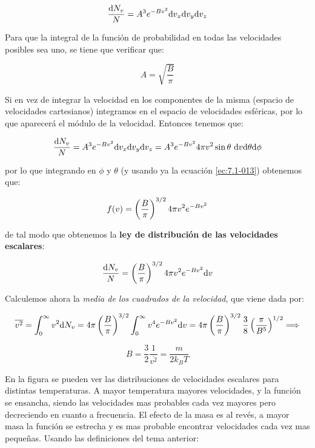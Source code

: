 \documentclass[12pt,a4paper,oneside]{book}
\begin{document}
\begin{equation}
\dfrac{\mathrm{d} N_{v}}{N} = A^3 e^{-Bv^2} \mathrm{d} v_x \mathrm{d} v_y \mathrm{d} v_z
\end{equation}

Para que la integral de la función de probabilidad en todas las velocidades posibles sea uno, se tiene que verificar que:

\begin{equation}
A = \sqrt{\dfrac{B}{\pi}} \label{ec:7.1-013}
\end{equation}

Si en vez de integrar la velocidad en los componentes de la misma (espacio de velocidades cartesianos) integramos en el espacio de velocidades esféricas, por lo que aparecerá el módulo de la velocidad. Entonces tenemos que:

\begin{equation}
\dfrac{\mathrm{d} N_{v}}{N} = A^3 e^{-Bv^2} \mathrm{d} v_x \mathrm{d} v_y \mathrm{d} v_z = A^3 e^{-Bv^2} 4 \pi v^2 \sin \theta \ \mathrm{d} v \mathrm{d} \theta \mathrm{d} \phi 
\end{equation}

por lo que integrando en $\phi$ y $\theta$ (y usando ya la ecuación \ref{ec:7.1-013}) obtenemos que:

\begin{equation}
f(v) = \left( \dfrac{B}{\pi} \right)^{3/2} 4 \pi v^2 e^{-B v^2}
\end{equation}


de tal modo que obtenemos la \textbf{ley de distribución de las velocidades escalares}:

\begin{equation}
\dfrac{\mathrm{d} N_v}{N} = \left( \dfrac{B}{\pi} \right)^{3/2} 4 \pi v^2 e^{-Bv^2} \mathrm{d} v \label{ec:7.1-016}
\end{equation}

Calculemos ahora la \textit{media de los cuadrados de la velocidad}, que viene dada por: 

$$ \overline{v^2} = \int_{0}^{\infty} v^2 \mathrm{d} N_v  = 4 \pi \left( \dfrac{B}{\pi} \right)^{3/2} \int_{0}^{\infty} v^4 e^{-Bv^2} \mathrm{d} v = 4 \pi \left( \dfrac{B}{\pi} \right)^{3/2} \dfrac{3}{8} \left( \dfrac{\pi}{B^5} \right)^{1/2} \Longrightarrow $$

\begin{equation}
B = \dfrac{3}{2} \dfrac{1}{\overline{v^2}} = \dfrac{m}{2 k_B T}
\end{equation}

En la figura se pueden ver las distribuciones de velocidades escalares para distintas temperaturas. A mayor temperatura mayores velocidades, y la función se ensancha, siendo las velocidades mas probables cada vez mayores pero decreciendo en cuanto a frecuencia. El efecto de la masa es al revés, a mayor masa la función se estrecha y es mas probable encontrar velocidades cada vez mas pequeñas. Usando las definiciones del tema anterior:
\end{document}
